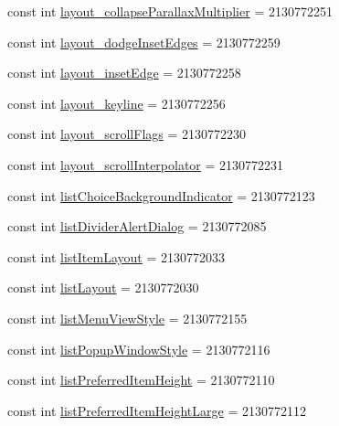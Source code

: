 \begin{CompactItemize}
\item 
const int \hyperlink{class__2doo_1_1_droid_1_1_resource_1_1_attribute_a19f27fa70319d08646c16eb9de84095}{layout\_\-collapseParallaxMultiplier} = 2130772251
\item 
const int \hyperlink{class__2doo_1_1_droid_1_1_resource_1_1_attribute_4226d6f6173bc6e2415dfffa44ab8d14}{layout\_\-dodgeInsetEdges} = 2130772259
\item 
const int \hyperlink{class__2doo_1_1_droid_1_1_resource_1_1_attribute_751183f26a94dd1aba6f32674b700e7c}{layout\_\-insetEdge} = 2130772258
\item 
const int \hyperlink{class__2doo_1_1_droid_1_1_resource_1_1_attribute_a64cc886f959a6e4f9575d3a823e309c}{layout\_\-keyline} = 2130772256
\item 
const int \hyperlink{class__2doo_1_1_droid_1_1_resource_1_1_attribute_4f14be97ffc914996bb316ada642ad28}{layout\_\-scrollFlags} = 2130772230
\item 
const int \hyperlink{class__2doo_1_1_droid_1_1_resource_1_1_attribute_da26e7353a16ebdb0b2765c8e315b31c}{layout\_\-scrollInterpolator} = 2130772231
\item 
const int \hyperlink{class__2doo_1_1_droid_1_1_resource_1_1_attribute_f3664dcb68eac88d72068589fd20fef1}{listChoiceBackgroundIndicator} = 2130772123
\item 
const int \hyperlink{class__2doo_1_1_droid_1_1_resource_1_1_attribute_4e819892f780eb7a65650ca9c37d48fb}{listDividerAlertDialog} = 2130772085
\item 
const int \hyperlink{class__2doo_1_1_droid_1_1_resource_1_1_attribute_936bdbe83baa6080d8052a85dbd45006}{listItemLayout} = 2130772033
\item 
const int \hyperlink{class__2doo_1_1_droid_1_1_resource_1_1_attribute_1f3820d4d7bd6e63705d5b2c38fe1db2}{listLayout} = 2130772030
\item 
const int \hyperlink{class__2doo_1_1_droid_1_1_resource_1_1_attribute_e9d6da15bba94b53b0112cfc2b927e12}{listMenuViewStyle} = 2130772155
\item 
const int \hyperlink{class__2doo_1_1_droid_1_1_resource_1_1_attribute_4d03581384d8a4b4470c032bc2aa9fbe}{listPopupWindowStyle} = 2130772116
\item 
const int \hyperlink{class__2doo_1_1_droid_1_1_resource_1_1_attribute_fa49b698982702a540510d2af8980e82}{listPreferredItemHeight} = 2130772110
\item 
const int \hyperlink{class__2doo_1_1_droid_1_1_resource_1_1_attribute_5e429e6ec488c3a95c7537efcc23296e}{listPreferredItemHeightLarge} = 2130772112

\end{CompactItemize}
